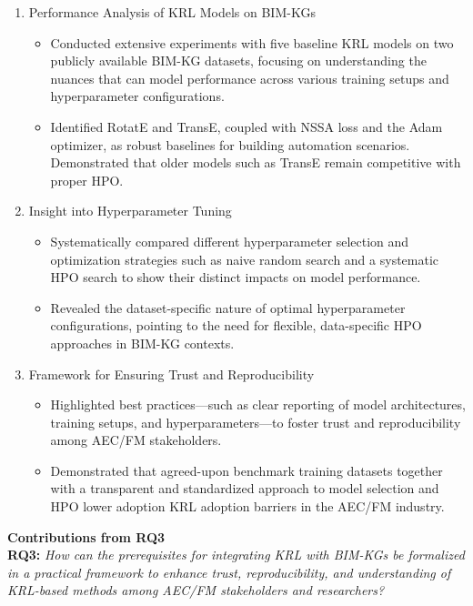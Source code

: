 \begin{enumerate}
\item 
Performance Analysis of \ac{KRL} Models on \acp{BIM-KG}
    \begin{itemize}
    \item 
    Conducted extensive experiments with five baseline \ac{KRL} models on two publicly available \ac{BIM-KG} datasets, focusing on understanding the nuances that can model performance across various training setups and hyperparameter configurations.

    \item 
    Identified RotatE and TransE, coupled with NSSA loss and the Adam optimizer, as robust baselines for building automation scenarios. Demonstrated that older models such as TransE remain competitive with proper \ac{HPO}.
    \end{itemize}

\item 
Insight into Hyperparameter Tuning
    \begin{itemize}
    \item 
    Systematically compared different hyperparameter selection and optimization strategies such as naive random search and a systematic \ac{HPO} search to show their distinct impacts on model performance.
    \item 
    Revealed the dataset-specific nature of optimal hyperparameter configurations, pointing to the need for flexible, data-specific \ac{HPO} approaches in \ac{BIM-KG} contexts.
    \end{itemize} 
\item 
Framework for Ensuring Trust and Reproducibility
    \begin{itemize}
    \item 
    Highlighted best practices—such as clear reporting of model architectures, training setups, and hyperparameters—to foster trust and reproducibility among \ac{AEC/FM} stakeholders.
    \item 
    Demonstrated that agreed-upon benchmark training datasets together with a transparent and standardized approach to model selection and \ac{HPO} lower adoption \ac{KRL} adoption barriers in the \ac{AEC/FM} industry.
    \end{itemize} 
\end{enumerate}

\noindent \textbf{Contributions from RQ3}\\
\noindent \textbf{RQ3:} \textit{How can the prerequisites for integrating KRL with BIM-KGs be formalized in a practical framework to enhance trust, reproducibility, and understanding of KRL-based methods among AEC/FM stakeholders and researchers?}

